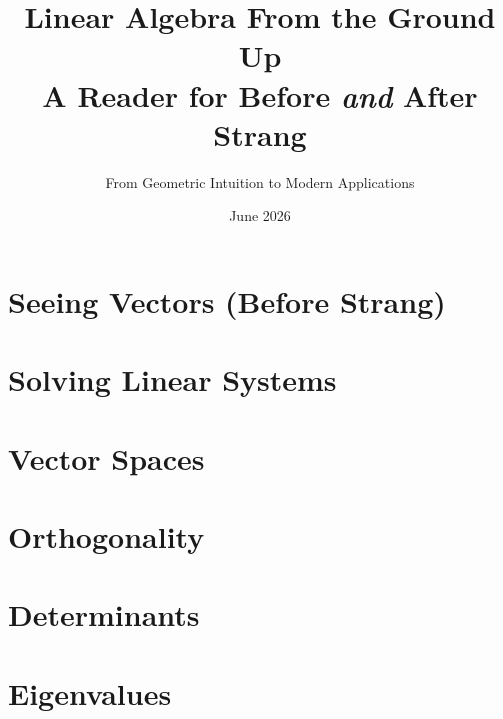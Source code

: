 \documentclass[11pt]{book}
\title{\textbf{Linear Algebra From the Ground Up}\\[0.4em]\large A Reader for Before \emph{and} After Strang}
\author{From Geometric Intuition to Modern Applications}
\date{June 2026}
\begin{document}
\frontmatter
\maketitle

\tableofcontents

\mainmatter

\part{Seeing Vectors (Before Strang)}






\part{Solving Linear Systems}






\part{Vector Spaces}







\part{Orthogonality}





\part{Determinants}



\part{Eigenvalues}






\end{document}
